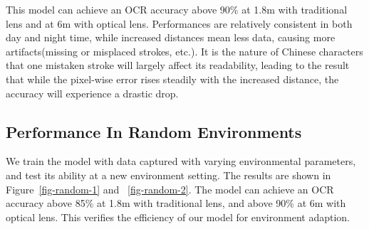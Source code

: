 This model can achieve an OCR accuracy above 90\% at 1.8m with traditional lens and at 6m with optical lens. Performances are relatively consistent in both day and night time, while increased distances mean less data, causing more artifacts(missing or misplaced strokes, etc.). It is the nature of Chinese characters that one mistaken stroke will largely affect its readability, leading to the result that while the pixel-wise error rises steadily with the increased distance, the accuracy will experience a drastic drop.

\subsection{Performance In Random Environments}
We train the model with data captured with varying environmental parameters, and test its ability at a new environment setting. The results are shown in Figure~\ref{fig-random-1} and ~\ref{fig-random-2}. The model can achieve an OCR accuracy above 85\% at 1.8m with traditional lens, and above 90\% at 6m with optical lens. This verifies the efficiency of our model for environment adaption.


